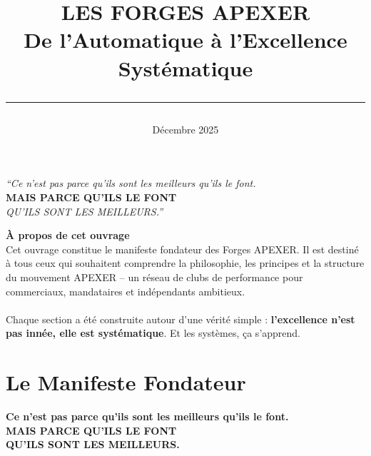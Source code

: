 \documentclass[12pt,a4paper,openany]{book}
\title{%
\vspace*{-1.5cm}
{\Huge\bfseries\color{apexred} LES FORGES APEXER}\\
\vspace{0.5cm}
{\Large De l'Automatique à l'Excellence Systématique}\\
\vspace{1.5cm}
{\color{darkbg}\rule{\textwidth}{2pt}}
}
\author{}
\date{Décembre 2025}
\begin{document}
\maketitle

\vspace*{1cm}
\begin{center}
\Large\textit{``Ce n'est pas parce qu'ils sont les meilleurs qu'ils le font.}\\
\vspace{0.3cm}
\textbf{\color{apexred}MAIS PARCE QU'ILS LE FONT}\\
\vspace{0.3cm}
\textit{QU'ILS SONT LES MEILLEURS.''}
\end{center}

\vspace{2cm}

\begin{tcolorbox}[colback=lightgray, colframe=apexred, boxrule=2pt]
\textbf{À propos de cet ouvrage}\\[0.3cm]
Cet ouvrage constitue le manifeste fondateur des Forges APEXER. Il est destiné à tous ceux qui souhaitent comprendre la philosophie, les principes et la structure du mouvement APEXER -- un réseau de clubs de performance pour commerciaux, mandataires et indépendants ambitieux.\\
\\
Chaque section a été construite autour d'une vérité simple : \textbf{l'excellence n'est pas innée, elle est systématique}. Et les systèmes, ça s'apprend.
\end{tcolorbox}

\tableofcontents

\clearpage

\chapter*{Le Manifeste Fondateur}

\begin{center}
\Large\color{apexred}\textbf{Ce n'est pas parce qu'ils sont les meilleurs qu'ils le font.}\\
\vspace{0.3cm}
\Large\color{apexred}\textbf{MAIS PARCE QU'ILS LE FONT}\\
\vspace{0.3cm}
\Large\color{apexred}\textbf{QU'ILS SONT LES MEILLEURS.}
\end{center}
\end{document}
